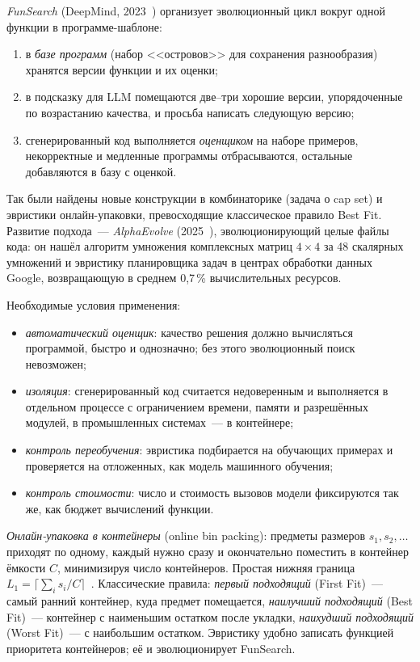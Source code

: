 \emph{FunSearch} (DeepMind, 2023~\cite{romera2024}) организует эволюционный цикл вокруг одной функции
в программе-шаблоне:
\begin{enumerate}
\item в \emph{базе программ} (набор <<островов>> для сохранения разнообразия) хранятся версии функции
и их оценки;
\item в подсказку для LLM помещаются две--три хорошие версии, упорядоченные по возрастанию качества, и
просьба написать следующую версию;
\item сгенерированный код выполняется \emph{оценщиком} на наборе примеров, некорректные и медленные
программы отбрасываются, остальные добавляются в базу с оценкой.
\end{enumerate}
Так были найдены новые конструкции в комбинаторике (задача о cap set) и эвристики онлайн-упаковки,
превосходящие классическое правило Best Fit. Развитие подхода~--- \emph{AlphaEvolve}
(2025~\cite{novikov2025}), эволюционирующий целые файлы кода: он нашёл алгоритм умножения комплексных
матриц $4 \times 4$ за 48 скалярных умножений и эвристику планировщика задач в центрах обработки
данных Google, возвращающую в среднем 0,7\,\% вычислительных ресурсов.

Необходимые условия применения:
\begin{itemize}
\item \emph{автоматический оценщик}: качество решения должно вычисляться программой, быстро и
однозначно; без этого эволюционный поиск невозможен;
\item \emph{изоляция}: сгенерированный код считается недоверенным и выполняется в отдельном процессе с
ограничением времени, памяти и разрешённых модулей, в промышленных системах~--- в контейнере;
\item \emph{контроль переобучения}: эвристика подбирается на обучающих примерах и проверяется на
отложенных, как модель машинного обучения;
\item \emph{контроль стоимости}: число и стоимость вызовов модели фиксируются так же, как бюджет
вычислений функции.
\end{itemize}

\emph{Онлайн-упаковка в контейнеры} (online bin packing): предметы размеров $s_1, s_2, \ldots$ приходят по
одному, каждый нужно сразу и окончательно поместить в контейнер ёмкости $C$, минимизируя число
контейнеров. Простая нижняя граница $L_1 = \lceil\sum_i s_i/C\rceil$~\cite{martello1990}. Классические
правила: \emph{первый подходящий} (First Fit)~--- самый ранний контейнер, куда предмет помещается,
\emph{наилучший подходящий} (Best Fit)~--- контейнер с наименьшим остатком после укладки, \emph{наихудший
подходящий} (Worst Fit)~--- с наибольшим остатком. Эвристику удобно записать функцией приоритета
контейнеров; её и эволюционирует FunSearch.

